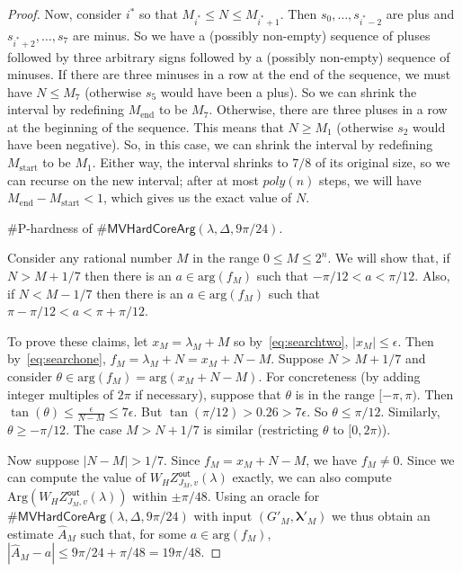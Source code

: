 \documentclass[11pt]{article}
\renewcommand\arg{\text{arg}}
\newcommand\Arg{\text{Arg}}
\def\Zout{Z^{\mathsf{out}}}
\def\lambdab{\ensuremath{\boldsymbol{\lambda}}}
\def\ArgMVHardCore#1{\#\ensuremath{\mathsf{MVHardCoreArg}(\lambda,\Delta,#1)}}
\begin{document}
\begin{proof}
Now,  consider $i^*$ so that
 $M_{i^*} \leq N \leq M_{i^*+1}$.
Then $s_0,\ldots, s_{i^*-2}$ are plus
and $s_{i^*+2},\ldots, s_{ 7}$ are minus.
So we have a (possibly non-empty) sequence of pluses followed by three
arbitrary signs followed by a (possibly non-empty) sequence of minuses.
If there are  three minuses in a row at the end of the sequence,
we must have  
$N\leq M_{ 7}$ (otherwise  $s_5$ would have been a plus).
So we can shrink the interval by
redefining $M_{\text{end}}$ to be $M_{ 7}$.
Otherwise, there are three pluses in a row at the beginning of the sequence.
This means that $N\geq M_1$ (otherwise $s_2$ would have been negative). So, in this case, we can shrink the interval by
redefining $M_{\text{start}}$ to be $M_1$.
Either way, the interval shrinks to $ 7/ 8$ of its original size, so we can recurse
on the new interval; after at most $poly(n)$ steps, we will have $M_{\text{end}}-M_{\text{start}}<1$, which gives us the exact value of $N$.


 

    
 
 \#P-hardness of $\ArgMVHardCore{9 \pi/24}$.
   
 Consider any   rational number $M$ in the range $ 0 \leq M \leq 2^n$.   
 We will show that, if $N> M+1/7$ then
there is an $a\in \arg(f_M)$ such that
$-\pi/12 <  a <   \pi/12$.
Also, if $N<M-1/7$ then
there is an $a\in \arg(f_M)$ such that
  $\pi - \pi/12 <  a  <\pi + \pi/12$.

To prove these claims, let $x_M = \lambda_M + M$ so by~\eqref{eq:searchtwo},
$|x_M| \leq \epsilon$.  
Then by~\eqref{eq:searchone},
$f_M = \lambda_M + N = x_M + N-M $.
Suppose $N>M+1/7$ and
consider $\theta \in   \arg(f_M) = \arg(x_M + N-M)$.
For concreteness (by adding integer multiples of $2\pi$ if necessary),
suppose that $\theta$ is in the range $[-\pi,\pi)$.
Then $ \tan(\theta)\leq \frac{\epsilon}{N-M} \leq 7 \epsilon$.
But $\tan(\pi/12) > 0.26 > 7\epsilon$.
So 
$\theta \leq \pi/12$.  
Similarly, $\theta \geq -\pi/12$.
The case $M>N+1/7$  is similar (restricting $\theta$ to $[0,2\pi)$).

 
Now suppose 
$|N-M|>1/7$. 
Since $f_M = x_M + N - M$, we have $f_M\neq 0$.
Since we can compute the value of   
$W_H \Zout_{J_M,v}(\lambda)$ exactly,
we can also compute   $\Arg(W_H \Zout_{J_M,v}(\lambda) )$  
within $\pm \pi/48$.
Using
an oracle for   $\ArgMVHardCore{9\pi/24}$ 
 with  input $(G'_M,\lambdab'_M)$
 we thus  
obtain an estimate $\hat{A}_M$
such that, for some $a\in \arg(f_M)$,
 $|\hat{A}_M -  a| \leq 9\pi/24+\pi/48=19\pi/48$.
 

\end{proof}
\end{document}
